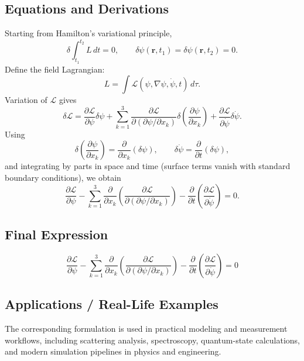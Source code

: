 \documentclass[12pt]{report}
\begin{document}
\subsection*{Equations and Derivations}
Starting from Hamilton's variational principle,
\begin{equation}
\delta \int_{t_1}^{t_2} L\,dt = 0,
\qquad
\delta\psi(\mathbf{r},t_1)=\delta\psi(\mathbf{r},t_2)=0.
\end{equation}
Define the field Lagrangian:
\begin{equation}
L = \int \mathcal{L}(\psi,\nabla\psi,\dot\psi,t)\,d\tau.
\end{equation}
Variation of $\mathcal{L}$ gives
\begin{equation}
\delta\mathcal{L}=\frac{\partial\mathcal{L}}{\partial\psi}\delta\psi
+\sum_{k=1}^{3}\frac{\partial\mathcal{L}}{\partial(\partial\psi/\partial x_k)}\delta\left(\frac{\partial\psi}{\partial x_k}\right)
+\frac{\partial\mathcal{L}}{\partial\dot\psi}\delta\dot\psi.
\end{equation}
Using
\begin{equation}
\delta\left(\frac{\partial\psi}{\partial x_k}\right)=\frac{\partial}{\partial x_k}(\delta\psi),
\qquad
\delta\dot\psi=\frac{\partial}{\partial t}(\delta\psi),
\end{equation}
and integrating by parts in space and time (surface terms vanish with standard boundary conditions), we obtain
\begin{equation}
\frac{\partial\mathcal{L}}{\partial\psi}
-\sum_{k=1}^{3}\frac{\partial}{\partial x_k}\left(\frac{\partial\mathcal{L}}{\partial(\partial\psi/\partial x_k)}\right)
-\frac{\partial}{\partial t}\left(\frac{\partial\mathcal{L}}{\partial\dot\psi}\right)=0.
\end{equation}

\subsection*{Final Expression}
\begin{equation}
\boxed{\frac{\partial\mathcal{L}}{\partial\psi}
-\sum_{k=1}^{3}\frac{\partial}{\partial x_k}\left(\frac{\partial\mathcal{L}}{\partial(\partial\psi/\partial x_k)}\right)
-\frac{\partial}{\partial t}\left(\frac{\partial\mathcal{L}}{\partial\dot\psi}\right)=0}
\end{equation}

\subsection*{Applications / Real-Life Examples}
The corresponding formulation is used in practical modeling and measurement workflows, including scattering analysis, spectroscopy, quantum-state calculations, and modern simulation pipelines in physics and engineering.
\end{document}
